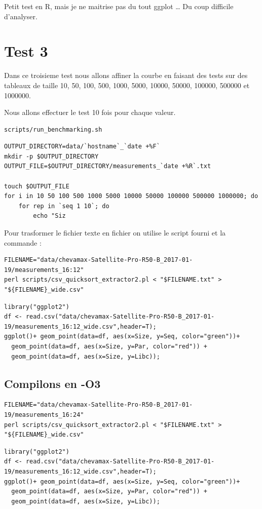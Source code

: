 \documentclass[11pt]{article}
\begin{document}
Petit test en R, mais je ne maitrise pas du tout ggplot \ldots{} Du coup
difficile d'analyser.

\section{Test 3}
\label{sec:orgheadline13}
Dans ce troisieme test nous allons affiner la courbe en faisant des tests
sur des tableaux de taille 10, 50, 100, 500, 1000, 5000, 10000, 50000,
100000, 500000 et 1000000.

Nous allons effectuer le test 10 fois pour chaque valeur.


\begin{verbatim}
scripts/run_benchmarking.sh
\end{verbatim}
\begin{verbatim}
OUTPUT_DIRECTORY=data/`hostname`_`date +%F`
mkdir -p $OUTPUT_DIRECTORY
OUTPUT_FILE=$OUTPUT_DIRECTORY/measurements_`date +%R`.txt

touch $OUTPUT_FILE
for i in 10 50 100 500 1000 5000 10000 50000 100000 500000 1000000; do
    for rep in `seq 1 10`; do
        echo "Siz
\end{verbatim}



Pour trasformer le fichier texte en fichier on utilise le script
fourni et la commande :

\begin{verbatim}
FILENAME="data/chevamax-Satellite-Pro-R50-B_2017-01-19/measurements_16:12"
perl scripts/csv_quicksort_extractor2.pl < "$FILENAME.txt" > "${FILENAME}_wide.csv"
\end{verbatim}

\begin{verbatim}
library("ggplot2")
df <- read.csv("data/chevamax-Satellite-Pro-R50-B_2017-01-19/measurements_16:12_wide.csv",header=T);
ggplot()+ geom_point(data=df, aes(x=Size, y=Seq, color="green"))+
  geom_point(data=df, aes(x=Size, y=Par, color="red")) + 
  geom_point(data=df, aes(x=Size, y=Libc));
\end{verbatim}


\subsection{Compilons en -O3}
\label{sec:orgheadline12}

\begin{verbatim}
FILENAME="data/chevamax-Satellite-Pro-R50-B_2017-01-19/measurements_16:24"
perl scripts/csv_quicksort_extractor2.pl < "$FILENAME.txt" > "${FILENAME}_wide.csv"
\end{verbatim}

\begin{verbatim}
library("ggplot2")
df <- read.csv("data/chevamax-Satellite-Pro-R50-B_2017-01-19/measurements_16:12_wide.csv",header=T);
ggplot()+ geom_point(data=df, aes(x=Size, y=Seq, color="green"))+
  geom_point(data=df, aes(x=Size, y=Par, color="red")) + 
  geom_point(data=df, aes(x=Size, y=Libc));
\end{verbatim}
\end{document}
